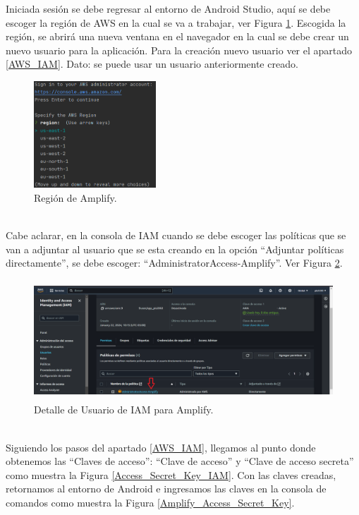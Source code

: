 \documentclass[a4paper,10pt, oneside, titlepage]{article}
\begin{document}
	\indent Iniciada sesión se debe regresar al entorno de Android Studio, aquí se debe escoger la región de AWS en la cual se va a trabajar, ver Figura \ref{Region_Amplify}. Escogida la región, se abrirá una nueva ventana en el navegador en la cual se debe crear un nuevo usuario para la aplicación. Para la creación nuevo usuario ver el apartado \ref{AWS_IAM}. Dato: se puede usar un usuario anteriormente creado.
	\begin{figure}[!h]
		\centering
		\includegraphics[width = 1\linewidth, height = 4cm]{Region_Amplify.png}
		\caption{Región de Amplify.}
		\label{Region_Amplify}
	\end{figure} \\
	\indent Cabe aclarar, en la consola de IAM cuando se debe escoger las políticas que se van a adjuntar al usuario que se esta creando en la opción “Adjuntar políticas directamente”, se debe escoger: ``AdministratorAccess-Amplify''. Ver Figura \ref{Detalle_Usuario_IAM_Amplify}.
	\begin{figure}[!h]
		\centering
		\includegraphics[width = 1\linewidth, height = 4.5cm]{Detalle_Usuario_IAM_Amplify.png}
		\caption{Detalle de Usuario de IAM para Amplify.}
		\label{Detalle_Usuario_IAM_Amplify}
	\end{figure} \\
	\indent Siguiendo los pasos del apartado \ref{AWS_IAM}, llegamos al punto donde obtenemos las ``Claves de acceso'': ``Clave de acceso'' y ``Clave de acceso secreta'' como muestra la Figura \ref{Access_Secret_Key_IAM}. Con las claves creadas, retornamos al entorno de Android e ingresamos las claves en la consola de comandos como muestra la Figura \ref{Amplify_Access_Secret_Key}.
\end{document}
